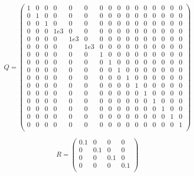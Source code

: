 \documentclass[main]{subfiles}
\begin{document}
\begin{equation}
\label{eq:Q}
Q = \left(\begin{array}{cccccccccccccccc}
1 & 0 & 0 & 0 & 0 & 0 & 0 & 0 & 0 & 0 & 0 & 0 & 0 & 0 & 0 & 0\\
0 & 1 & 0 & 0 & 0 & 0 & 0 & 0 & 0 & 0 & 0 & 0 & 0 & 0 & 0 & 0\\
0 & 0 & 1 & 0 & 0 & 0 & 0 & 0 & 0 & 0 & 0 & 0 & 0 & 0 & 0 & 0\\
0 & 0 & 0 & 1e3 & 0 & 0 & 0 & 0 & 0 & 0 & 0 & 0 & 0 & 0 & 0 & 0\\
0 & 0 & 0 & 0 & 1e3 & 0 & 0 & 0 & 0 & 0 & 0 & 0 & 0 & 0 & 0 & 0\\
0 & 0 & 0 & 0 & 0 & 1e3 & 0 & 0 & 0 & 0 & 0 & 0 & 0 & 0 & 0 & 0\\
0 & 0 & 0 & 0 & 0 & 0 & 1 & 0 & 0 & 0 & 0 & 0 & 0 & 0 & 0 & 0\\
0 & 0 & 0 & 0 & 0 & 0 & 0 & 1 & 0 & 0 & 0 & 0 & 0 & 0 & 0 & 0\\
0 & 0 & 0 & 0 & 0 & 0 & 0 & 0 & 1 & 0 & 0 & 0 & 0 & 0 & 0 & 0\\
0 & 0 & 0 & 0 & 0 & 0 & 0 & 0 & 0 & 1 & 0 & 0 & 0 & 0 & 0 & 0\\
0 & 0 & 0 & 0 & 0 & 0 & 0 & 0 & 0 & 0 & 1 & 0 & 0 & 0 & 0 & 0\\
0 & 0 & 0 & 0 & 0 & 0 & 0 & 0 & 0 & 0 & 0 & 1 & 0 & 0 & 0 & 0\\
0 & 0 & 0 & 0 & 0 & 0 & 0 & 0 & 0 & 0 & 0 & 0 & 1 & 0 & 0 & 0\\
0 & 0 & 0 & 0 & 0 & 0 & 0 & 0 & 0 & 0 & 0 & 0 & 0 & 1 & 0 & 0\\
0 & 0 & 0 & 0 & 0 & 0 & 0 & 0 & 0 & 0 & 0 & 0 & 0 & 0 & 1 & 0\\
0 & 0 & 0 & 0 & 0 & 0 & 0 & 0 & 0 & 0 & 0 & 0 & 0 & 0 & 0 & 1\\
\end{array}\right)
\end{equation}

\begin{equation}
\label{eq:R}
R = \left(\begin{array}{cccc}
0.1 & 0 & 0 & 0\\
0 & 0.1 & 0 & 0\\
0 & 0 & 0.1 & 0\\
0 & 0 & 0 & 0.1\\
\end{array}\right)
\end{equation}
\end{document}
